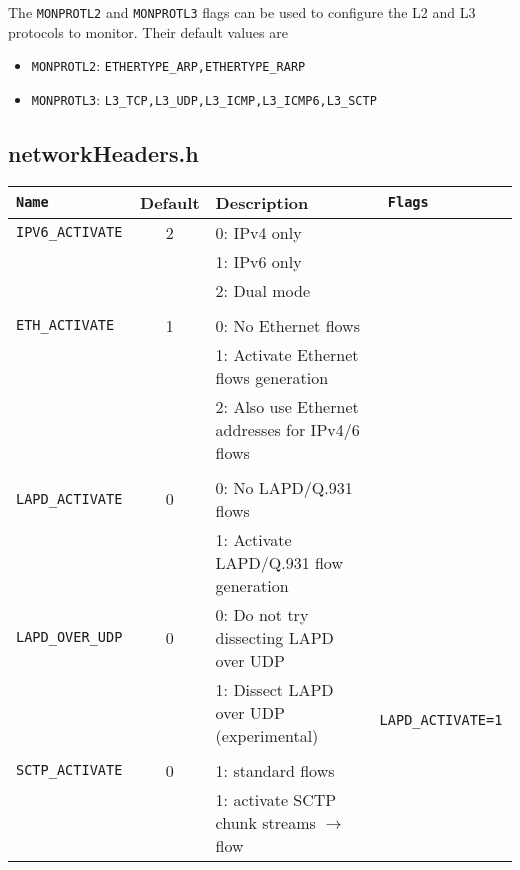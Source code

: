 The {\tt MONPROTL2} and {\tt MONPROTL3} flags can be used to configure the L2 and L3 protocols to monitor.
Their default values are
\begin{itemize}
    \item {\tt MONPROTL2}: {\tt ETHERTYPE\_ARP,ETHERTYPE\_RARP}
    \item {\tt MONPROTL3}: {\tt L3\_TCP,L3\_UDP,L3\_ICMP,L3\_ICMP6,L3\_SCTP}
\end{itemize}

\clearpage
\subsection{networkHeaders.h}\label{networkHeaders.h}
\begin{longtable}{>{\tt}lcl>{\tt\small}l}
    \toprule
    {\bf Name} & {\bf Default} & {\bf Description} & {\bf Flags}\\
    \midrule\endhead%
    IPV6\_ACTIVATE    &   2 & 0: IPv4 only                                           & \\
                      &     & 1: IPv6 only                                           & \\
                      &     & 2: Dual mode                                           & \\
    \\
    ETH\_ACTIVATE     &   1 & 0: No Ethernet flows                                   & \\
                      &     & 1: Activate Ethernet flows generation                  & \\
                      &     & 2: Also use Ethernet addresses for IPv4/6 flows        & \\
    \\
    LAPD\_ACTIVATE    &   0 & 0: No LAPD/Q.931 flows                                 & \\
                      &     & 1: Activate  LAPD/Q.931 flow generation                & \\
    LAPD\_OVER\_UDP   &   0 & 0: Do not try dissecting LAPD over UDP                 & \\
                      &     & 1: Dissect LAPD over UDP (experimental)                & LAPD\_ACTIVATE=1\\
    \\
    SCTP\_ACTIVATE    &   0 & 1: standard flows                                      & \\
                      &     & 1: activate SCTP chunk streams $\rightarrow$ flow      & \\

\end{longtable}
